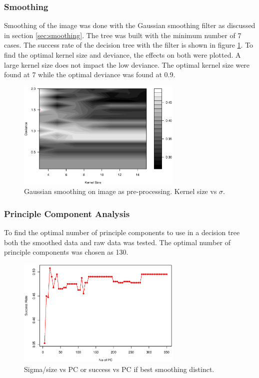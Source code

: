 \subsubsection{Smoothing}

Smoothing of the image was done with the Gaussian smoothing filter as discussed in section \ref{sec:smoothing}.
The tree was built with the minimum number of 7 cases.
The success rate of the decision tree with the filter is shown in figure \ref{fig:tree_smooth}.
To find the optimal kernel size and deviance, the effects on both were plotted.
A large kernel size does not impact the low deviance. The optimal kernel size were found at    7
while the optimal deviance was found at                                                        0.9.

\begin{figure}[H]
\centering
\includegraphics[width=0.7\textwidth]{graphics/tree_smooth}
\caption{Gaussian smoothing on image as pre-processing. Kernel size vs $\sigma$. }%
\label{fig:tree_smooth}
\end{figure}

\subsubsection{Principle Component Analysis}

To find the optimal number of principle components to use in a decision tree both the smoothed data and raw data was tested.
The optimal number of principle components was chosen as 130.


\begin{figure}[H]
\centering
\includegraphics[width=0.7\textwidth]{graphics/tree_pca}
\caption{Sigma/size vs PC or success vs PC if best smoothing distinct.}
\end{figure}


